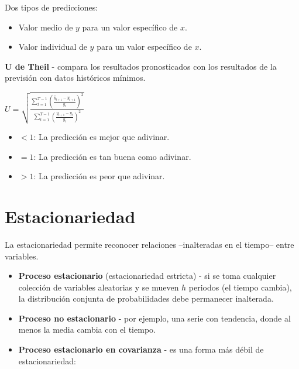 \documentclass[10pt, a4paper, landscape]{article}
\newcommand{\E}{\mathrm{E}}
\begin{document}
\begin{multicols}{3}
		Dos tipos de predicciones:
		
		\begin{itemize}[leftmargin=*]
			\item Valor medio de $y$ para un valor específico de $x$.
			\item Valor individual de $y$ para un valor específico de $x$.
		\end{itemize}
		
		\textbf{U de Theil} - compara los resultados pronosticados con los resultados de la previsión con datos históricos mínimos.
		
		\begin{center}
			$U = \sqrt{\frac{\sum_{t=1}^{T-1} \left( \frac{\hat{y}_{t+1} - y_{t+1}}{y_t} \right)^2}{\sum_{t=1}^{T-1} \left( \frac{y_{t+1} - y_t}{y_t} \right)^2}}$
		\end{center}
		
		\begin{itemize}[leftmargin=*]
			\item $< 1$: La predicción es mejor que adivinar.
			\item $= 1$: La predicción es tan buena como adivinar.
			\item $> 1$: La predicción es peor que adivinar.
		\end{itemize}
		
		\columnbreak
		
		\section*{Estacionariedad}
		
		La estacionariedad permite reconocer relaciones --inalteradas en el tiempo-- entre variables.
		
		\begin{itemize}[leftmargin=*]
			\item \textbf{Proceso estacionario} (estacionariedad estricta) - si se toma cualquier colección de variables aleatorias y se mueven $h$ periodos (el tiempo cambia), la distribución conjunta de probabilidades debe permanecer inalterada.
			\item \textbf{Proceso no estacionario} - por ejemplo, una serie con tendencia, donde al menos la media cambia con el tiempo.
			\item \textbf{Proceso estacionario en covarianza} - es una forma más débil de estacionariedad:
			
			\begin{itemize}[leftmargin=*]
\end{itemize}
\end{itemize}
\end{multicols}
\end{document}
